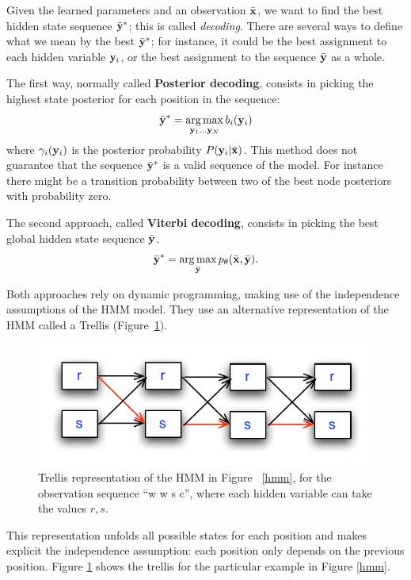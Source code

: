 Given the learned parameters and an
observation $\bar{\mathbf{x}}$, we want to find the best hidden state sequence
$\bar{\mathbf{y}}^*$; this is called \emph{decoding}. There are several ways to define what we mean by the best
$\bar{\mathbf{y}}^*$; for instance, it could be the best assignment to each hidden
variable $\mathbf{y}_i$, or the best assignment
to the sequence $\bar{\mathbf{y}}$ as a whole.

The first way, normally called \textbf{Posterior decoding}, consists
in picking the highest state posterior for each position in the sequence:
\begin{equation}
\bar{\mathbf{y}}^* = \operatorname*{arg\,max}_{\mathbf{y}_1 \ldots \mathbf{y}_N} b_i(\mathbf{y}_i)
\end{equation}
where $\gamma_i(\mathbf{y}_i)$ is the posterior probability $P(\mathbf{y}_i|\bar{\mathbf{x}})$. 
This method does not guarantee that the sequence $\bar{\mathbf{y}}^*$ is a
valid sequence of the model. For instance there might be a transition
probability between two of the best node posteriors with probability
zero. 

The second approach, called \textbf{Viterbi decoding}, consists in
picking the best global hidden state sequence $\bar{\mathbf{y}}$. 
\begin{equation}
\bar{\mathbf{y}}^* = \operatorname*{arg\,max}_{\bar{\mathbf{y}}} p_{\theta}(\bar{\mathbf{x}} ,\bar{\mathbf{y}}).
\end{equation}

Both approaches rely on dynamic programming, making use of the
independence assumptions of the HMM model. They use an alternative
representation of the HMM called a Trellis (Figure~\ref{fig:trellis}). 
\begin{figure}
\centering
\includegraphics[scale=1]{figs/sequences/trellis}
\caption[HMM Trellis representation.]{\label{fig:trellis} Trellis
  representation of the HMM in Figure ~\ref{hmm}, for the observation
  sequence ``w w s c'', where each hidden variable can take the values $r,s$.}
\end{figure}

This representation unfolds all possible states for each position and
makes explicit the independence assumption: each position only
depends on the previous position. Figure \ref{fig:trellis} shows the
trellis for the particular example in Figure \ref{hmm}. 


